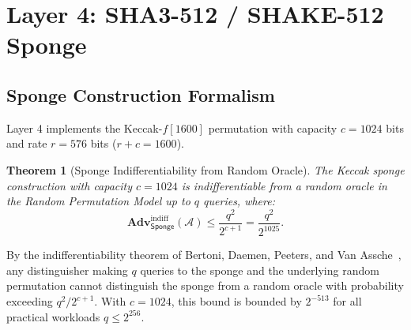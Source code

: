 \documentclass{ieeeaccess}
\newcommand{\Adv}{\mathbf{Adv}}
\newcommand{\calA}{\mathcal{A}}
\newtheorem{theorem}{Theorem}
\newenvironment{proof}{\begin{IEEEproof}\IEEEQEDoff}{\end{IEEEproof}}
\begin{document}
\section{Layer 4: SHA3-512 / SHAKE-512 Sponge}
\label{sec:L4}

\subsection{Sponge Construction Formalism}
Layer 4 implements the Keccak-$f[1600]$ permutation with capacity $c = 1024$ bits and rate $r = 576$ bits ($r + c = 1600$).

\begin{theorem}[Sponge Indifferentiability from Random Oracle]
\label{thm:L4-sponge}
The Keccak sponge construction with capacity $c = 1024$ is indifferentiable from a random oracle in the Random Permutation Model up to $q$ queries, where:
\begin{equation}
  \Adv_{\mathsf{Sponge}}^{\mathrm{indiff}}(\calA) \leq \frac{q^2}{2^{c+1}} = \frac{q^2}{2^{1025}}.
\end{equation}
\end{theorem}
\begin{proof}
By the indifferentiability theorem of Bertoni, Daemen, Peeters, and Van Assche~\cite{BDPA2008}, any distinguisher making $q$ queries to the sponge and the underlying random permutation cannot distinguish the sponge from a random oracle with probability exceeding $q^2 / 2^{c+1}$. With $c = 1024$, this bound is bounded by $2^{-513}$ for all practical workloads $q \leq 2^{256}$.
\end{proof}
\end{document}
